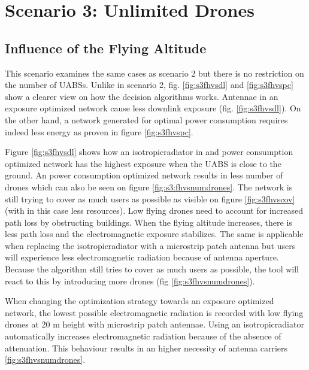 \section{Scenario 3: Unlimited Drones}
\subsection{Influence of the Flying Altitude}

This scenario examines the same cases as scenario 2 but there is no restriction on the number of \gls{UABS}s. 
Unlike in scenario 2, fig. \ref{fig:s3fhvsdl} and \ref{fig:s3fhvspc} show a clearer view on how the decision algorithms
works. Antennae in an exposure optimized network cause less downlink exposure (fig. \ref{fig:s3fhvsdl}). On the other hand, 
a network generated for optimal power consumption requires indeed less energy as proven in figure \ref{fig:s3fhvspc}. 

Figure \ref{fig:s3fhvsdl} shows how an \gls{isotropicradiator} in and power consumption optimized network has the highest exposure when 
the \gls{UABS}  is close to the ground. An power consumption optimized network results in less number of drones which can also be seen 
on figure \ref{fig:s3:fhvsnumdrones}. The network is still trying to cover as much users as possible as visible on figure 
\ref{fig:s3fhvscov} (with in this case less resources). Low flying drones need to account for increased path loss by obstructing buildings.
When the flying altitude increases, there is less path loss and the electromagnetic exposure stabilizes. The same is applicable when replacing
the \gls{isotropicradiator} with a microstrip patch antenna but users will experience less electromagnetic radiation 
because of antenna aperture. Because the algorithm still tries to cover as much users as possible, the tool will react to this by 
introducing more drones (fig \ref{fig:s3fhvsnumdrones}).

When changing the optimization strategy towards an exposure optimized network, the lowest possible electromagnetic radiation is recorded
with low flying drones at 20 m height with microstrip patch antennae. Using an \gls{isotropicradiator} automatically increases electromagnetic 
radiation because of the absence of attenuation. This behaviour results in an higher necessity of antenna carriers \ref{fig:s3fhvsnumdrones}.


